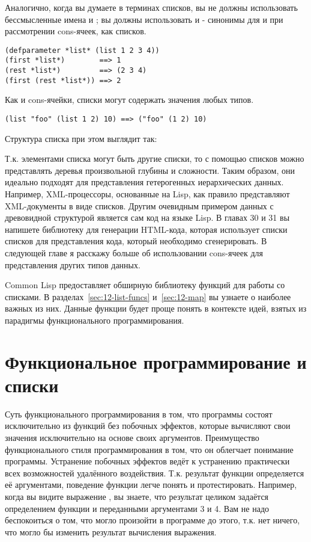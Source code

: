 Аналогично, когда вы думаете в терминах списков, вы не должны использовать бессмысленные
имена  и ; вы должны использовать  и  -
синонимы для  и  при рассмотрении cons-ячеек, как списков.

\begin{lstlisting}
(defparameter *list* (list 1 2 3 4))
(first *list*)        ==> 1
(rest *list*)         ==> (2 3 4)
(first (rest *list*)) ==> 2
\end{lstlisting}

Как и cons-ячейки, списки могут содержать значения любых типов.

\begin{lstlisting}
(list "foo" (list 1 2) 10) ==> ("foo" (1 2) 10)
\end{lstlisting}

Структура списка при этом выглядит так:


Т.к. элементами списка могут быть другие списки, то с помощью списков можно представлять
деревья произвольной глубины и сложности. Таким образом, они идеально подходят для
представления гетерогенных иерархических данных. Например, XML-процессоры, основанные на
Lisp, как правило представляют XML-документы в виде списков. Другим очевидным примером
данных с древовидной структурой является сам код на языке Lisp. В главах 30 и 31 вы
напишете библиотеку для генерации HTML-кода, которая использует списки списков для
представления кода, который необходимо сгенерировать. В следующей главе я расскажу больше
об использовании cons-ячеек для представления других типов данных.

Common Lisp предоставляет обширную библиотеку функций для работы со списками. В
разделах~\ref{sec:12-list-funcs} и~\ref{sec:12-map} вы узнаете о наиболее важных из
них. Данные функции будет проще понять в контексте идей, взятых из парадигмы
функционального программирования.

\section{Функциональное программирование и списки}

Суть функционального программирования в том, что программы состоят исключительно из
функций без побочных эффектов, которые вычисляют свои значения исключительно на основе
своих аргументов. Преимущество функционального стиля программирования в том, что он
облегчает понимание программы. Устранение побочных эффектов ведёт к устранению практически
всех возможностей удалённого воздействия. Т.к. результат функции определяется её
аргументами, поведение функции легче понять и протестировать. Например, когда вы видите
выражение , вы знаете, что результат целиком задаётся определением функции
\code{+} и переданными аргументами 3 и 4. Вам не надо беспокоиться о том, что могло
произойти в программе до этого, т.к. нет ничего, что могло бы изменить результат
вычисления выражения.

